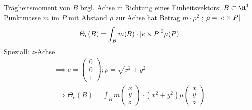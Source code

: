 Trägheitsmoment von $B$ bzgl. Achse in Richtung eines Einheitsvektors; $B \subset \R^3$ \\
Punktmasse $m$ im $P$ mit Abstand $\rho$ zur Achse hat Betrag $m \cdot \rho^2$ ; $\rho = \abs{e \times P}$
\[ \Theta_e(B) = \int_B m(B) \cdot \abs{e \times P}^2 \mu(P) \]
Speziall: $z$-Achse \\
\begin{gather*}
	\implies e = \begin{pmatrix} 0 \\ 0 \\ 1 \end{pmatrix} ; \rho = \sqrt{x^2 + y^2} \\
	\implies \Theta_e(B) = \int_B m\begin{pmatrix} x \\ y \\ z \end{pmatrix} \cdot (x^2 + y^2) \mu\begin{pmatrix} x \\ y \\ z \end{pmatrix}
\end{gather*}

